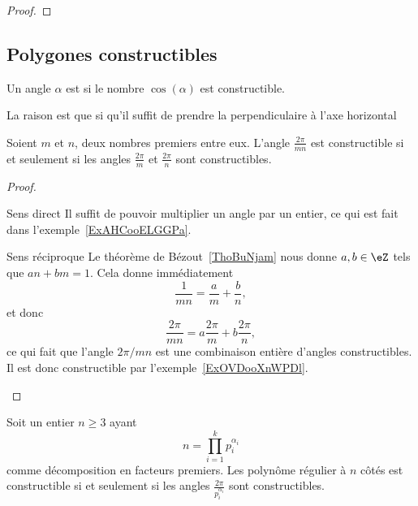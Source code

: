 \begin{proof}
\end{proof}

\subsection{Polygones constructibles}

\begin{definition}
    Un angle \( \alpha\) est  si le nombre \( \cos(\alpha)\) est constructible.
\end{definition}
La raison est que si qu'il suffit de prendre la perpendiculaire à l'axe horizontal

\begin{lemma}   \label{LemMAHooXcOCpr}
    Soient \( m\) et \( n\), deux nombres premiers entre eux. L'angle \( \frac{ 2\pi }{ mn }\) est constructible si et seulement si les angles \( \frac{ 2\pi }{ m }\) et \( \frac{ 2\pi }{ n }\) sont constructibles.
\end{lemma}

\begin{proof}
    \begin{subproof}
        \item[Sens direct]
            Il suffit de pouvoir multiplier un angle par un entier, ce qui est fait dans l'exemple~\ref{ExAHCooELGGPa}.
        \item[Sens réciproque]
            Le théorème de Bézout~\ref{ThoBuNjam} nous donne \( a,b\in \eZ\) tels que \( an+bm=1\). Cela donne immédiatement
            \begin{equation}
                \frac{1}{ mn }=\frac{ a }{ m }+\frac{ b }{ n },
            \end{equation}
            et donc
            \begin{equation}
                \frac{ 2\pi }{ mn }=a\frac{ 2\pi }{ m }+b\frac{ 2\pi }{ n },
            \end{equation}
            ce qui fait que l'angle \( 2\pi/mn\) est une combinaison entière d'angles constructibles. Il est donc constructible par l'exemple~\ref{ExOVDooXnWPDl}.
    \end{subproof}
\end{proof}

\begin{lemma}   \label{LemUKNooSBzDyY}
    Soit un entier \( n\geq 3\) ayant
    \begin{equation}
        n=\prod_{i=1}^kp_i^{\alpha_i}
    \end{equation}
    comme décomposition en facteurs premiers. Les polynôme régulier à \( n\) côtés est constructible si et seulement si les angles \( \frac{ 2\pi }{ p_i^{\alpha_i} }\) sont constructibles.
\end{lemma}


